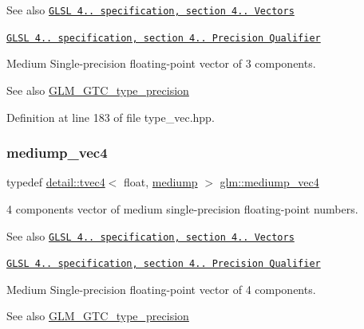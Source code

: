 \begin{DoxySeeAlso}{See also}
\href{http://www.opengl.org/registry/doc/GLSLangSpec.4.20.8.pdf}{\tt G\+L\+SL 4.. specification, section 4.. Vectors} 

\href{http://www.opengl.org/registry/doc/GLSLangSpec.4.20.8.pdf}{\tt G\+L\+SL 4.. specification, section 4.. Precision Qualifier}
\end{DoxySeeAlso}
Medium Single-\/precision floating-\/point vector of 3 components. \begin{DoxySeeAlso}{See also}
\hyperlink{group__gtc__type__precision}{G\+L\+M\+\_\+\+G\+T\+C\+\_\+type\+\_\+precision} 
\end{DoxySeeAlso}


Definition at line 183 of file type\+\_\+vec.\+hpp.

\mbox{\label{group__core__precision_ga2527a7f322907fecd58bef0a7a9c3ecd}} 
\subsubsection{\texorpdfstring{mediump\+\_\+vec4}{mediump\_vec4}}
{\footnotesize\ttfamily typedef \hyperlink{structglm_1_1detail_1_1tvec4}{detail\+::tvec4}$<$ float, \hyperlink{namespaceglm_a0f04f086094c747d227af4425893f545a6416f3ea0c9025fb21ed50c4d6620482}{mediump} $>$ \hyperlink{group__core__precision_ga2527a7f322907fecd58bef0a7a9c3ecd}{glm\+::mediump\+\_\+vec4}}

4 components vector of medium single-\/precision floating-\/point numbers.

\begin{DoxySeeAlso}{See also}
\href{http://www.opengl.org/registry/doc/GLSLangSpec.4.20.8.pdf}{\tt G\+L\+SL 4.. specification, section 4.. Vectors} 

\href{http://www.opengl.org/registry/doc/GLSLangSpec.4.20.8.pdf}{\tt G\+L\+SL 4.. specification, section 4.. Precision Qualifier}
\end{DoxySeeAlso}
Medium Single-\/precision floating-\/point vector of 4 components. \begin{DoxySeeAlso}{See also}
\hyperlink{group__gtc__type__precision}{G\+L\+M\+\_\+\+G\+T\+C\+\_\+type\+\_\+precision} 
\end{DoxySeeAlso}


